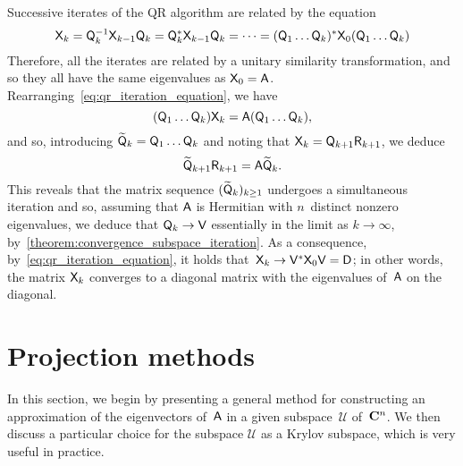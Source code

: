 Successive iterates of the QR algorithm are related by the equation
\begin{equation}
    \label{eq:qr_iteration_equation}
    \mathsf X_{k} = \mathsf Q_k^{-1}  \mathsf X_{k-1} \mathsf Q_k
    = \mathsf Q_k^* \mathsf X_{k-1} \mathsf Q_k
    = \dots = (\mathsf Q_1 \dots \mathsf Q_k)^* \mathsf X_{0} (\mathsf Q_1 \dots \mathsf Q_k)
\end{equation}
Therefore, all the iterates are related by a unitary similarity transformation,
and so they all have the same eigenvalues as $\mathsf X_0 = \mathsf A$.
Rearranging~\eqref{eq:qr_iteration_equation},
we have
\[
    (\mathsf Q_1 \dots \mathsf Q_k) \mathsf X_{k} = \mathsf A (\mathsf Q_1 \dots \mathsf Q_k),
\]
and so, introducing $\widetilde {\mathsf Q}_k = \mathsf Q_1 \dots \mathsf Q_k$
and noting that $\mathsf X_k = \mathsf Q_{k+1} \mathsf R_{k+1}$,
we deduce
\[
    \widetilde {\mathsf Q}_{k+1} \mathsf R_{k+1} = \mathsf A \widetilde {\mathsf Q}_k.
\]
This reveals that
the matrix sequence $(\widetilde{\mathsf Q}_{k})_{k\geq 1}$ undergoes a simultaneous iteration and so,
assuming that $\mathsf A$ is Hermitian with $n$~distinct nonzero eigenvalues,
we deduce that $\mathsf Q_k \to \mathsf V$ essentially in the limit as $k \to \infty$,
by~\cref{theorem:convergence_subspace_iteration}.
As a consequence, by~\eqref{eq:qr_iteration_equation},
it holds that~$\mathsf X_k \to \mathsf V^* \mathsf X_0 \mathsf V = \mathsf D$;
in other words, the matrix $\mathsf X_k$ converges to a diagonal matrix with the eigenvalues of~$\mathsf A$ on the diagonal.

\section{Projection methods}
\label{sec:projection_methods}
In this section,
we begin by presenting a general method for constructing an approximation of the eigenvectors of~$\mathsf A$ in a given subspace~$\mathcal U$ of~$\mathbf C^{n}$.
We then discuss a particular choice for the subspace $\mathcal U$
as a Krylov subspace, which is very useful in practice.

